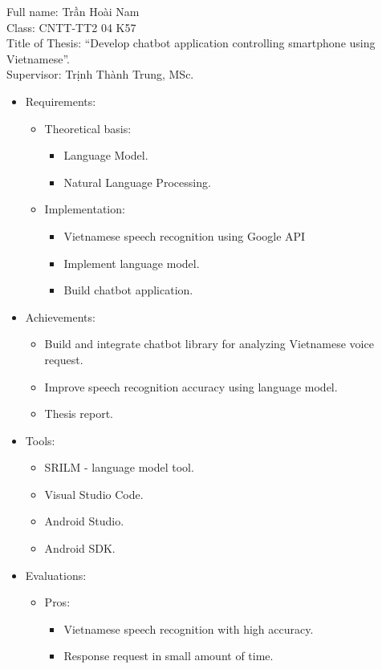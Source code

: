 \documentclass[12pt]{report}
\begin{document}
\noindent Full name: Trần Hoài Nam \\
Class: CNTT-TT2 04 K57\\
Title of Thesis: ``Develop chatbot application controlling smartphone using Vietnamese''.\\
Supervisor: Trịnh Thành Trung, MSc.
\begin{itemize}
	\item Requirements:
	\begin{itemize}
		\item Theoretical basis:		
		\begin{itemize}
			\item Language Model.
			\item Natural Language Processing.
		\end{itemize}
		\item Implementation:		
		\begin{itemize}
			\item Vietnamese speech recognition using Google API
			\item Implement language model.
			\item Build chatbot application.
		\end{itemize}
	\end{itemize}
	\item Achievements:
	\begin{itemize}
		\item Build and integrate chatbot library for analyzing Vietnamese voice request.
		\item Improve speech recognition accuracy using language model.
		\item Thesis report.
	\end{itemize}
	\item Tools:
	\begin{itemize}
		\item SRILM - language model tool.
		\item Visual Studio Code.
		\item Android Studio.
		\item Android SDK.
	\end{itemize}
	\item Evaluations:
	\begin{itemize}
		\item Pros:		
		\begin{itemize}
			\item Vietnamese speech recognition with high accuracy.
			\item Response request in small amount of time.

\end{itemize}
\end{itemize}
\end{itemize}
\end{document}
